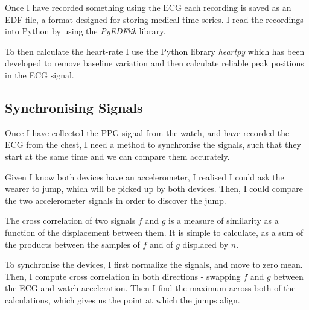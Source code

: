 \documentclass[12pt,a4paper,twoside,openany]{report}
\begin{document}
Once I have recorded something using the ECG 
each recording is saved as an EDF file, a format
designed for storing medical time series. I read the recordings into Python
by using the \emph{PyEDFlib} library.

To then calculate the heart-rate I use the Python library \emph{heartpy} which
has been developed to remove baseline variation and then calculate reliable
peak positions in the ECG signal.

\subsection{Synchronising Signals} \label{sec:sync}

Once I have collected the PPG signal from the watch, and have recorded the ECG
from the chest, I need a method to synchronise the signals, such that they
start at the same time and we can compare them accurately.

%

Given I know both devices have an accelerometer, I realised I could ask the
wearer to jump, which will be picked up by both devices. Then, I
could compare the two accelerometer signals in order to discover the
jump.

The cross correlation of two signals \(f\) and \(g\) is a measure of
similarity as a function of the displacement between them. It is simple to
calculate, as a sum of the products between the samples of \(f\) and of \(g\)
displaced by \(n\).

To synchronise the devices, I first
normalize the signals, and move to zero mean. Then, I compute cross
correlation in both directions - swapping $f$ and $g$ between the ECG and
watch acceleration. Then I find the maximum across both of the calculations,
which gives us the point at which the jumps align.

%
%
%
%
\end{document}
